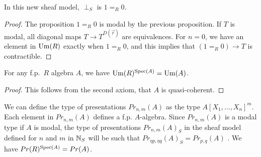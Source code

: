     \begin{proposition}
      In this new sheaf model, $\perp_S$ is $1 =_R 0$.
    \end{proposition}

    \begin{proof}
      The proposition $1=_R0$ is modal by the previous proposition.
      If $T$ is modal, all diagonal maps $T\rightarrow T^{D(\vec{r})}$ are equivalences. For $n = 0$, we have
      an element in $\mathrm{Um}(R)$ exactly when $1=_R0$, and this implies that $(1=_R0)\rightarrow T$ is contractible.
    \end{proof}
    
    \begin{lemma}\label{Um}
      For any f.p.\ $R$ algebra $A$, we have $\mathrm{Um}(R)^{\operatorname{Spec}(A)} = \mathrm{Um}(A)$.
    \end{lemma}

    \begin{proof}
      This follows from the second axiom, that $A$ is quasi-coherent.
    \end{proof}




    
    We can define the type of presentations $Pr_{n,m}(A)$ as the type $A[X_1,\dots,X_n]^m$. Each element in $Pr_{n,m}(A)$ defines a
    f.p. $A$-algebra. Since $Pr_{n,m}(A)$ is a modal type if $A$ is modal, the type of presentations $Pr_{n,m}(A)_S$ in the sheaf model
    defined for $n$ and $m$ in $\mathbb{N}_S$ will be such that $Pr_{\eta p,\eta q}(A)_S = Pr_{p,q}(A)$ \cite{CRS21}.
    We have $Pr(R)^{\operatorname{Spec}(A)} = Pr(A)$.
    
